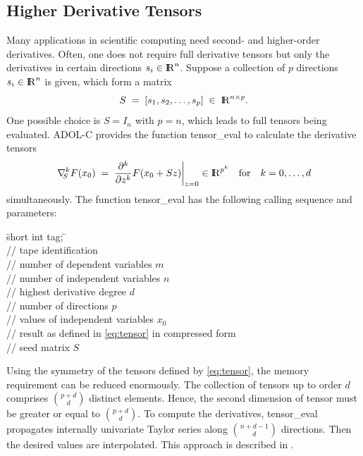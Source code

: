 \documentclass[11pt,twoside]{article}
\newcommand{\R}{{ {\rm I} \kern -.225em {\rm R} }}
\begin{document}
\subsection{Higher Derivative Tensors}
\label{higherOrderDeriv}
%
Many applications in scientific computing need second- and higher-order
derivatives. Often, one does not require full derivative tensors but 
only the derivatives in certain directions $s_i \in \R^{n}$.
Suppose a collection of $p$ directions
$s_i \in \R^{n}$ is given, which form a matrix
\[
S\; =\; \left [ s_1, s_2,\ldots,  s_p \right ]\; \in \;
 \R^{n \times p}.
\]
One possible choice is $S = I_n$ with  $p = n$, which leads to
full tensors being evaluated. 
ADOL-C provides the function {\sf tensor\_eval}
to calculate the derivative tensors
\begin{eqnarray}
\label{eq:tensor}
\left. \nabla_{\mbox{$\scriptstyle \!\!S$}}^{k}
     F(x_0) \; = \; \frac{\partial^k}{\partial z^k} F(x_0+Sz) \right |_{z=0} 
     \in \R^{p^k}\quad \mbox{for} \quad k = 0,\ldots,d
\end{eqnarray}
simultaneously. The function {\sf tensor\_eval} has the following calling sequence and 
parameters:
%
\begin{tabbing}
\hspace{0.5in}\={\sf short int tag;} \hspace{1.1in}\= \kill    %
\\
         \> // tape identification \\
                 \> // number of dependent variables $m$ \\
                 \> // number of independent variables $n$\\
                 \> // highest derivative degree $d$\\
                 \> // number of directions $p$\\
           \> // values of independent variables $x_0$\\
\> // result as defined in \eqref{eq:tensor} in compressed form\\
        \> // seed matrix $S$
\end{tabbing}
%
Using the symmetry of the tensors defined by \eqref{eq:tensor}, the memory  
requirement can be reduced enormously. The collection of  tensors up to order $d$ comprises  
$\binom{p+d}{d}$ distinct elements. Hence, the second dimension of {\sf tensor} must be 
greater or equal to $\binom{p+d}{d}$.
To compute the derivatives, {\sf tensor\_eval} propagates internally univariate Taylor 
series along $\binom{n+d-1}{d}$ directions. Then the desired values are interpolated. This
approach is described in \cite{Griewank97}.
\end{document}
